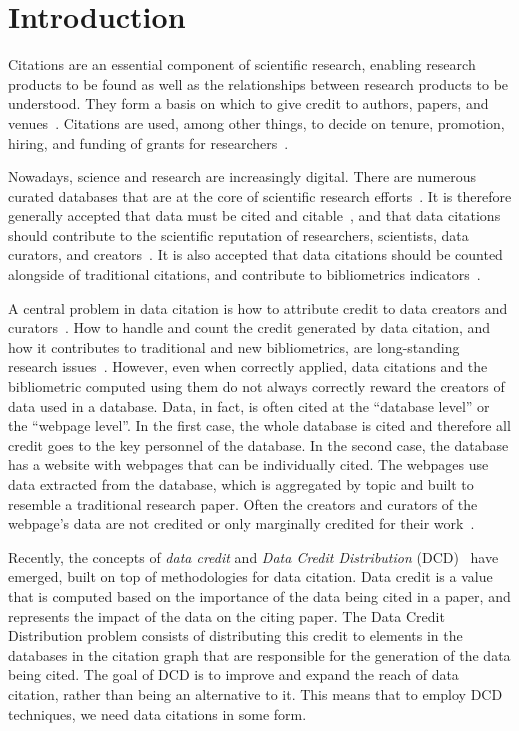 \section{Introduction}

Citations are an essential component of scientific research, enabling research products to be found as well as the relationships between research products to be understood. 
They form a basis on which to give credit to authors, papers, and venues~\citep{ZouP16, cousijn2019bringing, cronin1984}.
Citations are used, among other things, to decide on tenure, promotion, hiring, and funding of grants for researchers~\citep{meho2007impact, Cronin01, Hartley17, Kosten16}.

Nowadays, science and research are increasingly digital. There are numerous curated databases that are at the core of scientific research efforts~\citep{bunemann2016citation}.
It is therefore generally accepted that data must be cited and citable~\citep{LawrenceEtAl2011,CallaghanDPTCKABBLLMHSWW12}, and that data citations should contribute to the scientific reputation of researchers, scientists, data curators, and creators~\citep{AltmanEtAl2015,Spengler2012}.
It is also accepted that data citations should be counted alongside of traditional citations, and contribute to bibliometrics indicators~\citep{Belter2014,Peters2016}.

A central problem in data citation is how to attribute credit to data creators and curators~\cite{buneman2019summ}. 
How to handle and count the credit generated by data citation, and how it contributes to traditional and new bibliometrics, are long-standing research issues~\citet{garfield1999journal,Borgman2016}.
However, even when correctly applied, data citations and the bibliometric computed using them do not always correctly reward the creators of data used in a database.
Data, in fact, is often cited at the ``database level'' or the ``webpage level''. 
In the first case, the whole database is cited and therefore all credit goes to the key personnel of the database.
In the second case, the database has a website with webpages that can be individually cited. 
The webpages use data extracted from the database, which is aggregated by topic and built to resemble a traditional research paper.
Often the creators and curators of the webpage's data are not credited or only marginally credited for their work~\citep{AlawiniDSTW17}.

Recently, the concepts of \emph{data credit} and \emph{Data Credit Distribution} (DCD)~\citep{creditFang18,transitiveCreditKatz2014,zeng2020assigning} have emerged, built on top of methodologies for data citation. 
Data credit is a value that is computed based on the importance of the data being cited in a paper, and represents the impact of the data on the citing paper. 
The Data Credit Distribution problem consists of distributing this credit to elements in the databases in the citation graph that are responsible for the generation of the data being cited. The goal of DCD is to improve and expand the reach of data citation, rather than being an alternative to it. This means that to employ DCD techniques, we need data citations in some form.

